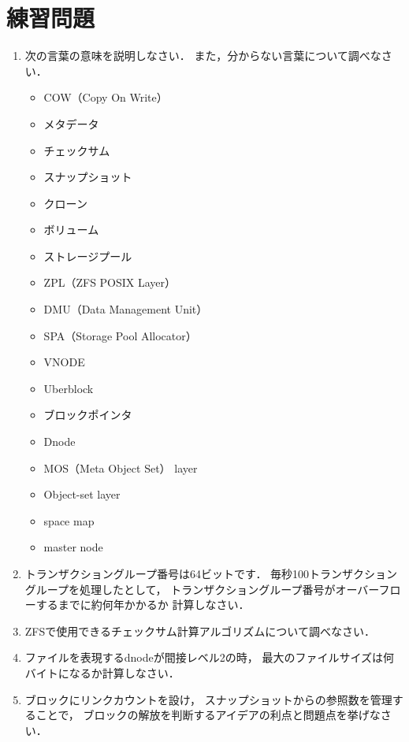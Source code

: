 \newpage
\section*{練習問題}
\begin{enumerate}
  \renewcommand{\labelenumi}{\ttfamily\arabic{chapter}.\arabic{enumi}}
  \setlength{\leftskip}{1em}
\item 次の言葉の意味を説明しなさい．
  また，分からない言葉について調べなさい．
  \begin{itemize}
  \item COW（Copy On Write）
  \item メタデータ
  \item チェックサム
  \item スナップショット
  \item クローン
  \item ボリューム
  \item ストレージプール
  \item ZPL（ZFS POSIX Layer）
  \item DMU（Data Management Unit）
  \item SPA（Storage Pool Allocator）
  \item VNODE
  \item Uberblock
  \item ブロックポインタ
  \item Dnode
  \item MOS（Meta Object Set） layer
  \item Object-set layer
  \item space map
  \item master node
  \end{itemize}
  \item トランザクショングループ番号は64ビットです．
    毎秒100トランザクショングループを処理したとして，
    トランザクショングループ番号がオーバーフローするまでに約何年かかるか
    計算しなさい．
  \item ZFSで使用できるチェックサム計算アルゴリズムについて調べなさい．
  \item ファイルを表現するdnodeが間接レベル2の時，
    最大のファイルサイズは何バイトになるか計算しなさい．
  \item ブロックにリンクカウントを設け，
    スナップショットからの参照数を管理することで，
    ブロックの解放を判断するアイデアの利点と問題点を挙げなさい．
\end{enumerate}
